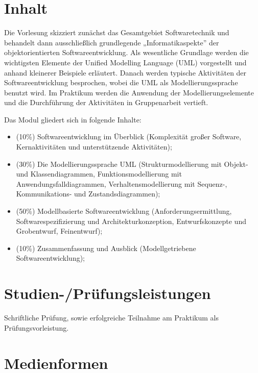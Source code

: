 \section*{Inhalt\label{/mi-2017/modulbeschreibungen-bachelor/BA_Softwaretechnik}}\label{inhaltpathlabelmi-2017modulbeschreibungen-bachelorbaux5fsoftwaretechnik}

Die Vorlesung skizziert zunächst das Gesamtgebiet Softwaretechnik und
behandelt dann ausschließlich grundlegende „Informatikaspekte'' der
objektorientierten Softwareentwicklung. Als wesentliche Grundlage werden
die wichtigsten Elemente der Unified Modelling Language (UML)
vorgestellt und anhand kleinerer Beispiele erläutert. Danach werden
typische Aktivitäten der Softwareentwicklung besprochen, wobei die UML
als Modellierungssprache benutzt wird. Im Praktikum werden die Anwendung
der Modellierungselemente und die Durchführung der Aktivitäten in
Gruppenarbeit vertieft.

Das Modul gliedert sich in folgende Inhalte:

\begin{itemize}
\tightlist
\item
  (10\%) Softwareentwicklung im Überblick (Komplexität großer Software,
  Kernaktivitäten und unterstützende Aktivitäten);
\item
  (30\%) Die Modellierungssprache UML (Strukturmodellierung mit Objekt-
  und Klassendiagrammen, Funktionsmodellierung mit
  Anwendungsfalldiagrammen, Verhaltensmodellierung mit Sequenz-,
  Kommunikations- und Zustandsdiagrammen);
\item
  (50\%) Modellbasierte Softwareentwicklung (Anforderungsermittlung,
  Softwarespezifizierung und Architekturkonzeption, Entwurfskonzepte und
  Grobentwurf, Feinentwurf);
\item
  (10\%) Zusammenfassung und Ausblick (Modellgetriebene
  Softwareentwicklung);
\end{itemize}

\section*{Studien-/Prüfungsleistungen\label{/mi-2017/modulbeschreibungen-bachelor/BA_Softwaretechnik}}\label{studien-pruxfcfungsleistungenpathlabelmi-2017modulbeschreibungen-bachelorbaux5fsoftwaretechnik}

Schriftliche Prüfung, sowie erfolgreiche Teilnahme am Praktikum als
Prüfungsvorleistung.

\section*{Medienformen\label{/mi-2017/modulbeschreibungen-bachelor/BA_Softwaretechnik}}\label{medienformenpathlabelmi-2017modulbeschreibungen-bachelorbaux5fsoftwaretechnik}

